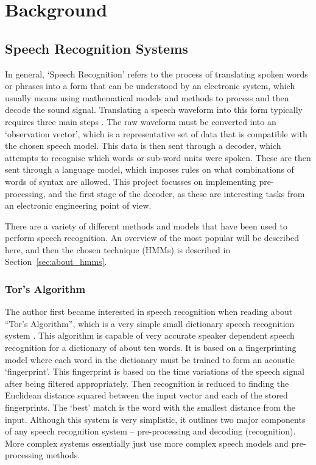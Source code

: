 \chapter{Background} %
\label{cha:background}


\section{Speech Recognition Systems} %
\label{sec:speech_recognition_systems}
	In general, `Speech Recognition' refers to the process of translating spoken words or phrases into a form that can be understood by an electronic system, which usually means using mathematical models and methods to process and then decode the sound signal.  Translating a speech waveform into this form typically requires three main steps \cite{melnikoff2003speech}.  The raw waveform must be converted into an `observation vector', which is a representative set of data that is compatible with the chosen speech model.  This data is then sent through a decoder, which attempts to recognise which words or sub-word units were spoken.  These are then sent through a language model, which imposes rules on what combinations of words of syntax are allowed.  This project focusses on implementing pre-processing, and the first stage of the decoder, as these are interesting tasks from an electronic engineering point of view.

	There are a variety of different methods and models that have been used to perform speech recognition.  An overview of the most popular will be described here, and then the chosen technique (HMMs) is described in Section~\ref{sec:about_hmms}.

	\subsection{Tor's Algorithm} %
	\label{sub:tors_algorithm}
		The author first became interested in speech recognition when reading about ``Tor's Algorithm'', which is a very simple small dictionary speech recognition system \cite{tor2003}.  This algorithm is capable of very accurate speaker dependent speech recognition for a dictionary of about ten words.  It is based on a fingerprinting model where each word in the dictionary must be trained to form an acoustic `fingerprint'.  This fingerprint is based on the time variations of the speech signal after being filtered appropriately.  Then recognition is reduced to finding the Euclidean distance squared between the input vector and each of the stored fingerprints.  The `best' match is the word with the smallest distance from the input.
		Although this system is very simplistic, it outlines two major components of any speech recognition system -- pre-processing and decoding (recognition).  More complex systems essentially just use more complex speech models and pre-processing methods.


